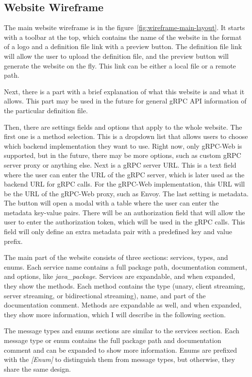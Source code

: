 \subsection{Website Wireframe}
The main website wireframe is in the figure~\ref{fig:wireframe-main-layout}.
It starts with a toolbar at the top, which contains the name of the website in the format of a logo and a definition file link with a preview button.
The definition file link will allow the user to upload the definition file, and the preview button will generate the website on the fly.
This link can be either a local file or a remote path.

Next, there is a part with a brief explanation of what this website is and what it allows.
This part may be used in the future for general gRPC API information of the particular definition file.

Then, there are settings fields and options that apply to the whole website.
The first one is a method selection.
This is a dropdown list that allows users to choose which backend implementation they want to use.
Right now, only gRPC-Web is supported, but in the future, there may be more options, such as custom gRPC server proxy or anything else.
Next is a gRPC server URL\@.
This is a text field where the user can enter the URL of the gRPC server, which is later used as the backend URL for gRPC calls.
For the gRPC-Web implementation, this URL will be the URL of the gRPC-Web proxy, such as Envoy.
The last setting is metadata.
The button will open a modal with a table where the user can enter the metadata key-value pairs.
There will be an authorization field that will allow the user to enter the authorization token, which will be used in the gRPC calls.
This field will only define an extra metadata pair with a predefined key and value prefix.

The main part of the website consists of three sections: services, types, and enums.
Each service name contains a full package path, documentation comment, and options, like \textit{java\_package}.
Services are expandable, and when expanded, they show the methods.
Each method contains the type (unary, client streaming, server streaming, or bidirectional streaming), name, and part of the documentation comment.
Methods are expandable as well, and when expanded, they show more information, which I will describe in the following section.

The message types and enums sections are similar to the services section.
Each message type or enum contains the full package path and documentation comment and can be expanded to show more information.
Enums are prefixed with the \textit{[Enum]} to distinguish them from message types, but otherwise, they share the same design.


